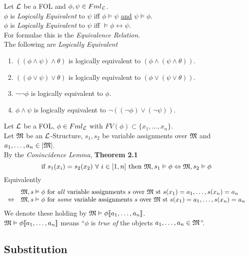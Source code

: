\documentclass[11pt,a4paper]{article}
\begin{document}
Let $\mathcal{L}$ be a FOL and $\phi,\psi\in Fml_{\mathcal{L}}$.\\
$\phi$ is \textit{Logically Equivalent} to $\psi$ iff
$\phi\vDash\psi$ \underline{and} $\psi\vDash\phi$.\\
\ie $\phi$ is \textit{Logically Equivalent} to $\psi$ iff $\vDash\phi\leftrightarrow\psi$.\\
\nb For formulae this is the \textit{Equivalence Relation}.\\

The following are \textit{Logically Equivalent}
\begin{enumerate}
	\item $((\phi\wedge\psi)\wedge\theta)$ is logically equivalent to $(\phi\wedge(\psi\wedge\theta))$.
	\item $((\phi\vee\psi)\vee\theta)$ is logically equivalent to $(\phi\vee(\psi\vee\theta))$.
	\item $\neg\neg\phi$ is logically equivalent to $\phi$.
	\item $\phi\wedge\psi$ is logically equivalent to $\neg((\neg\phi)\vee(\neg\psi))$.
\end{enumerate}

Let $\mathcal{L}$ be a FOL, $\phi\in Fml_{\mathcal{L}}$ with $FV(\phi)\subset\{x_1,\dots,x_n\}$.\\
Let $\mathfrak{M}$ be an $\mathcal{L}$-Structure, $s_1,s_2$ be variable assignments over $\mathfrak{M}$ and $a_1,\dots,a_n\in|\mathfrak{M}|$.\\
By the \textit{Conincidence Lemma}, \textbf{Theorem 2.1}
$$\text{if }s_1(x_i)=s_2(x_2)\ \forall\ i\in[1,n]\text{ then }\M,s_1\vDash\phi\Leftrightarrow\M,s_2\vDash\phi$$
Equivalently
\[\begin{array}{rl}
&\mathfrak{M},s\vDash\phi\text{ for \textit{all} variable assignments }s\text{ over }\mathfrak{M}\text{ st }s(x_1)=a_1,\dots,s(x_n)=a_n\\
\Leftrightarrow&\mathfrak{M},s\vDash\phi\text{ for \textit{some} variable assignments }s\text{ over }\mathfrak{M}\text{ st }s(x_1)=a_1,\dots,s(x_n)=a_n
\end{array}\]
We denote these holding by $\mathfrak{M}\vDash\phi[\![a_1,\dots,a_n]\!]$.\\
\nb $\mathfrak{M}\vDash\phi[\![a_1,\dots,a_n]\!]$ means ``$\phi$ is \textit{true of} the objects $a_1,\dots,a_n\in\mathfrak{M}$''.\\

\subsection{Substitution}
\end{document}
